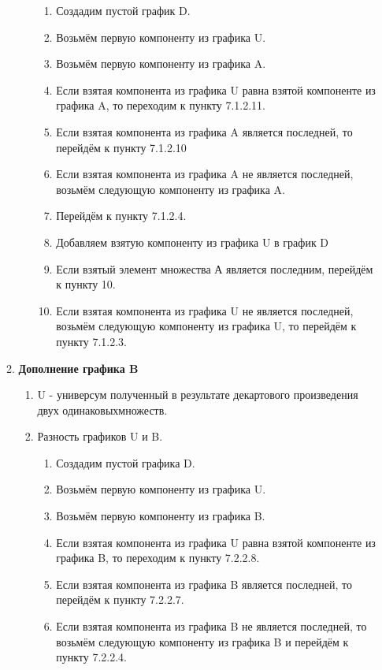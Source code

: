 \documentclass[a4paper,12pt]{extarticle}
\begin{document}
\begin{enumerate}
\begin{enumerate}[label*=\arabic*.]
\begin{enumerate}[label*=\arabic*.]
      \begin{enumerate}[label*=\arabic*.]
        \item Создадим пустой график D.
        \item Возьмём первую компоненту из графика U.
        \item Возьмём первую компоненту из графика A.
        \item Если взятая компонента из графика U равна взятой компоненте из графика A, то переходим к пункту 7.1.2.11.
        \item Если взятая компонента из графика A является последней, то перейдём к пункту 7.1.2.10
        \item Если взятая компонента из графика A не является последней, возьмём следующую компоненту из графика A.
        \item Перейдём к пункту 7.1.2.4.
        \item Добавляем взятую компоненту из графика U в график D
        \item Если взятый элемент множества А является последним, перейдём к пункту 10.
        \item Если взятая компонента из графика U не является последней, возьмём следующую компоненту из графика U, то перейдём к пункту 7.1.2.3.
      \end{enumerate}
    \end{enumerate}
    \item \textbf{Дополнение графика B}
    \begin{enumerate}[label*=\arabic*.]
      \item U - универсум полученный в результате декартового произведения двух одинаковыхмножеств.
      \item Разность графиков U и B.
        \begin{enumerate}[label*=\arabic*.]
          \item Создадим пустой графика D.
          \item Возьмём первую компоненту из графика U.
          \item Возьмём первую компоненту из графика B.
          \item Если взятая компонента из графика U равна взятой компоненте из графика B, то переходим к пункту 7.2.2.8.
          \item Если взятая компонента из графика B является последней, то перейдём к пункту 7.2.2.7.
          \item Если взятая компонента из графика B не является последней, то возьмём следующую компоненту из графика B и перейдём к пункту 7.2.2.4.

\end{enumerate}
\end{enumerate}
\end{enumerate}
\end{enumerate}
\end{document}
